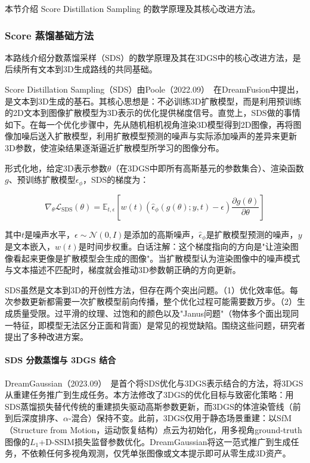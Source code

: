 本节介绍 Score Distillation Sampling 的数学原理及其核心改进方法。

\subsubsection{Score 蒸馏基础方法}

本路线介绍分数蒸馏采样（SDS）的数学原理及其在3DGS中的核心改进方法，是后续所有文本到3D生成路线的共同基础。

Score Distillation Sampling（SDS）由Poole（2022.09）~\cite{2209_14988}在DreamFusion中提出，是文本到3D生成的基石。其核心思想是：不必训练3D扩散模型，而是利用预训练的2D文本到图像扩散模型为3D表示的优化提供梯度信号。直觉上，SDS做的事情如下。在每一个优化步骤中，先从随机相机视角渲染3D模型得到2D图像，再将图像加噪后送入扩散模型，利用扩散模型预测的噪声与实际添加噪声的差异来更新3D参数，使渲染结果逐渐逼近扩散模型所学习的图像分布。

形式化地，给定3D表示参数$\theta$（在3DGS中即所有高斯基元的参数集合）、渲染函数$g$、预训练扩散模型$\epsilon_\phi$，SDS的梯度为：

\begin{equation}
\label{eq:sds}
\nabla_\theta \mathcal{L}_{\text{SDS}}(\theta) = \mathbb{E}_{t,\epsilon}\left[w(t)\left(\hat{\epsilon}_\phi\left(g(\theta);y,t\right) - \epsilon\right)\frac{\partial g(\theta)}{\partial \theta}\right]
\end{equation}

其中$t$是噪声水平，$\epsilon \sim \mathcal{N}(0,I)$是添加的高斯噪声，$\hat{\epsilon}_\phi$是扩散模型预测的噪声，$y$是文本嵌入，$w(t)$是时间步权重。白话注解：这个梯度指向的方向是"让渲染图像看起来更像是扩散模型会生成的图像"。当扩散模型认为渲染图像中的噪声模式与文本描述不匹配时，梯度就会推动3D参数朝正确的方向更新。

SDS虽然是文本到3D的开创性方法，但存在两个突出问题。（1）优化效率低。每次参数更新都需要一次扩散模型前向传播，整个优化过程可能需要数万步。（2）生成质量受限。过平滑的纹理、过饱和的颜色以及"Janus问题"（物体多个面出现同一特征，即模型无法区分正面和背面）是常见的视觉缺陷。围绕这些问题，研究者提出了多种改进方案。

\paragraph{SDS 分数蒸馏与 3DGS 结合}

DreamGaussian（2023.09）~\cite{2309_16653}是首个将SDS优化与3DGS表示结合的方法，将3DGS从重建任务推广到生成任务。本方法修改了3DGS的优化目标与致密化策略：用SDS蒸馏损失替代传统的重建损失驱动高斯参数更新，而3DGS的体渲染管线（前到后深度排序、$\alpha$-混合）保持不变。此前，3DGS仅用于静态场景重建：以SfM（Structure from Motion，运动恢复结构）点云为初始化，用多视角ground-truth图像的$L_1$+$\text{D-SSIM}$损失监督参数优化。DreamGaussian将这一范式推广到生成任务，不依赖任何多视角观测，仅凭单张图像或文本提示即可从零生成3D资产。

